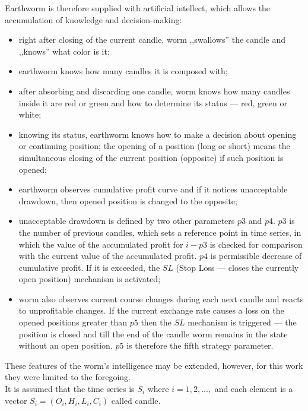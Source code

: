 \documentclass[runningheads,a4paper]{llncs}
\begin{document}
Earthworm is therefore supplied with artificial intellect, which allows the accumulation of knowledge and decision-making:
\begin{itemize}
\item right after closing of the current candle, worm ,,swallows'' the candle and ,,knows'' what color is it;
\item earthworm knows how many candles it is composed with;
\item after absorbing and discarding one candle, worm knows how many candles inside it are red or green and how to determine its status --- red, green or white;
\item knowing its status, earthworm knows how to make a decision about opening or continuing position; the opening of a position (long or short) means the simultaneous closing of the current position (opposite) if such position is opened;
\item earthworm observes cumulative profit curve and if it  notices unacceptable drawdown, then opened position is changed to the opposite;
\item unacceptable drawdown is defined by two other parameters $p3$ and $p4$. $p3$ is the number of previous candles, which sets a reference point in time series, in which the value of the accumulated profit for $i-p3$ is checked for comparison with the current value of the accumulated profit. $p4$ is permissible decrease of cumulative profit. If it is exceeded, the $SL$ (Stop Loss --- closes the currently open position) mechanism is activated;
\item worm also observes current course changes during  each next candle and reacts to unprofitable changes. If the current exchange rate causes a loss on the opened positions greater than $p5$ then the $SL$ mechanism is triggered --- the position is closed and till the end of the candle worm remains in the state without an open position. $p5$ is therefore the fifth strategy parameter. 
\end{itemize}

These features of the worm's intelligence may be extended, however, for this work they were limited to the foregoing. \\

It is assumed that the time series is $S_i$ where $i = 1, 2, ...,$ and each element is a vector $S_i = (O_i, H_i, L_i, C_i)$ called candle.\\
\end{document}
